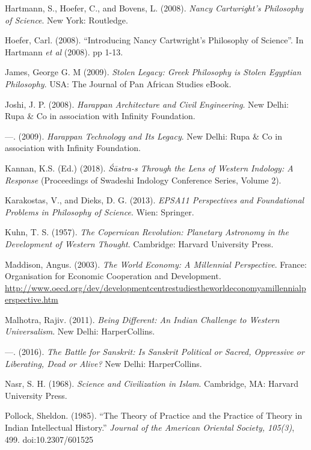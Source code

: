 \begin{thebibliography}{99}
  Hartmann, S., Hoefer, C., and Bovens, L. (2008). \textit{Nancy Cartwright's Philosophy of Science}. New York: Routledge.

  Hoefer, Carl. (2008). “Introducing Nancy Cartwright’s Philosophy of Science”. In Hartmann \textit{et al} (2008). pp 1-13.

  James, George G. M (2009). \textit{Stolen Legacy: Greek Philosophy is Stolen Egyptian Philosophy}. USA: The Journal of Pan African Studies eBook.

  Joshi, J. P. (2008). \textit{Harappan Architecture and Civil Engineering}. New Delhi: Rupa \& Co in association with Infinity Foundation.

  ---. (2009). \textit{Harappan Technology and Its Legacy}. New Delhi: Rupa \& Co in association with Infinity Foundation.

  Kannan, K.S. (Ed.) (2018). \textit{Śāstra-s Through the Lens of Western Indology: A Response} (Proceedings of Swadeshi Indology Conference Series, Volume 2).

  Karakostas, V., and Dieks, D. G. (2013). \textit{EPSA11 Perspectives and Foundational Problems in Philosophy of Science}. Wien: Springer.

  Kuhn, T. S. (1957). \textit{The Copernican Revolution: Planetary Astronomy in the Development of Western Thought}. Cambridge: Harvard University Press.

  Maddison, Angus. (2003). \textit{The World Economy: A Millennial Perspective}. France: Organisation for Economic Cooperation and Development. \url{http://www.oecd.org/dev/developmentcentrestudiestheworldeconomyamillennialperspective.htm}

  Malhotra, Rajiv. (2011). \textit{Being Different: An Indian Challenge to Western Universalism}. New Delhi: HarperCollins.

  ---. (2016). \textit{The Battle for Sanskrit: Is Sanskrit Political or Sacred, Oppressive or Liberating, Dead or Alive?} New Delhi: HarperCollins.

  Nasr, S. H. (1968). \textit{Science and Civilization in Islam}. Cambridge, MA: Harvard University Press.

  Pollock, Sheldon. (1985). “The Theory of Practice and the Practice of Theory in Indian Intellectual History.” \textit{Journal of the American Oriental Society, 105(3)}, 499. doi:10.2307/601525


\end{thebibliography}

